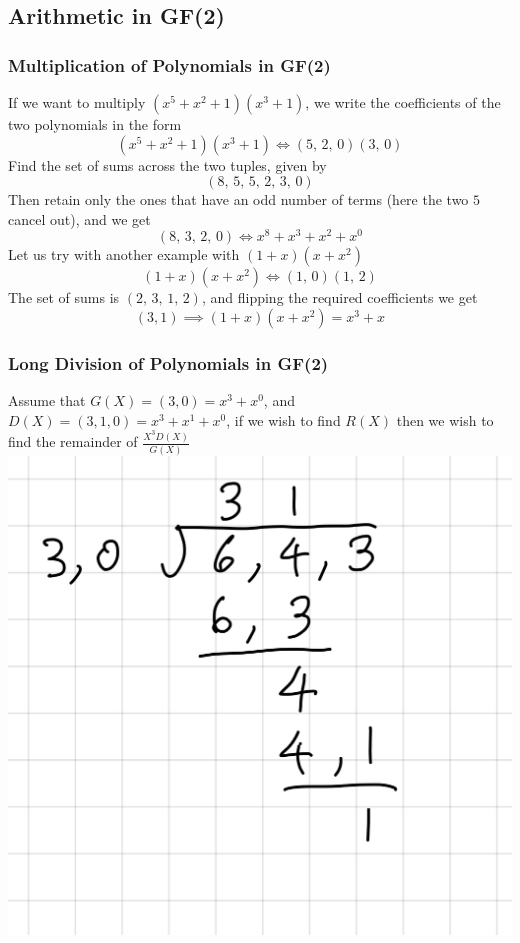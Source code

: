 \documentclass[../../main.tex]{subfiles}
\begin{document}
\subsection{Arithmetic in GF(2)}
\subsubsection{Multiplication of Polynomials in GF(2)}
If we want to multiply $(x^5 + x^2 + 1)(x^3+1)$, we write the coefficients of the two polynomials in the form
\[
(x^5 + x^2 + 1)(x^3+1)\iff (5,\,2,\,0)(3,\,0)
\]
Find the set of sums across the two tuples, given by
\[
(8,\,5,\,5,\,2,\,3,\,0)
\]
Then retain only the ones that have an odd number of terms (here the two $5$ cancel out), and we get
\[
(8,\,3,\,2,\,0)\iff x^8 + x^3 + x^2 + x^0
\]
Let us try with another example with $(1+x)(x+x^2)$
\[
(1+x)(x+x^2)\iff (1,\,0)(1,\,2)
\]
The set of sums is $(2,\,3,\,1,\,2)$, and flipping the required coefficients we get
\[
(3,1)\implies (1+x)(x+x^2) = x^3 + x
\]
\subsubsection{Long Division of Polynomials in GF(2)}
Assume that $G(X) = (3,0) = x^3 + x^0$, and $D(X) = (3,1,0) = x^3 + x^1 + x^0$, if we wish to find $R(X)$ then we wish to find the remainder of $\frac{X^{3}D(X)}{G(X)}$\\
\includegraphics[width=.5\textwidth]{images/long_division_example_polynomial.jpeg}
\end{document}
